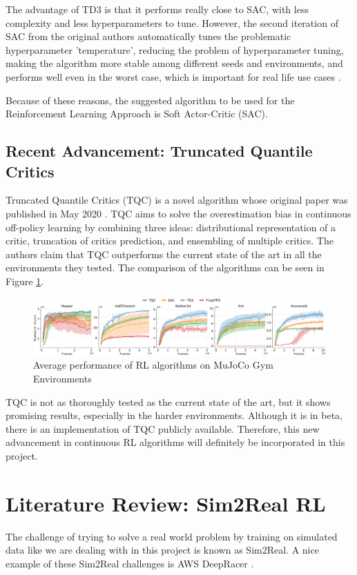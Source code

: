 \documentclass[12pt,twoside]{report}
\begin{document}
The advantage of TD3 is that it performs really close to SAC, with less complexity and less hyperparameters to tune. However, the second iteration of SAC from the original authors automatically tunes the problematic hyperparameter 'temperature', reducing the problem of hyperparameter tuning, making the algorithm more stable among different seeds and environments, and performs well even in the worst case, which is important for real life use cases \cite{sacOG}. 

Because of these reasons, the suggested algorithm to be used for the Reinforcement Learning Approach is Soft Actor-Critic (SAC).

\subsection{Recent Advancement: Truncated Quantile Critics}

Truncated Quantile Critics (TQC) is a novel algorithm whose original paper was published in May 2020 \cite{tqc-paper}. TQC aims to solve the overestimation bias in continuous off-policy learning by combining three ideas: distributional representation of a critic, truncation of critics prediction, and ensembling of multiple critics. The authors claim that TQC outperforms the current state of the art in all the environments they tested. The comparison of the algorithms can be seen in Figure \ref{fig:tqc-comparison}.

\begin{figure}[h]
\centering
\includegraphics[width = \hsize]{figures/tqc comparison.png}
\caption{Average performance of RL algorithms on MuJoCo Gym Environments \cite{tqc-paper}}
\label{fig:tqc-comparison}
\end{figure}

TQC is not as thoroughly tested as the current state of the art, but it shows promising results, especially in the harder environments. Although it is in beta, there is an implementation of TQC publicly available. Therefore, this new advancement in continuous RL algorithms will definitely be incorporated in this project.

\section{Literature Review: Sim2Real RL}
The challenge of trying to solve a real world problem by training on simulated data like we are dealing with in this project is known as Sim2Real. A nice example of these Sim2Real challenges is AWS DeepRacer \cite{aws-deepracer}.
\end{document}
